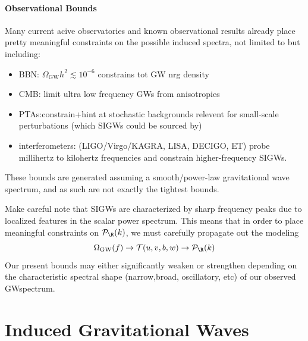 \paragraph{Observational Bounds}
Many current acive observatories and known observational results already place pretty meaningful constraints on the possible induced spectra, not limited to but including:
\begin{itemize}
    \item BBN: $\Omega_{\mathrm{GW}} h^2 \lesssim 10^{-6}$ constrains tot GW nrg density 
    \item CMB: limit ultra low frequency GWs from anisotropies
    \item PTAs:constrain+hint at stochastic backgrounds relevent for small-scale perturbations (which SIGWs could be sourced by)
    \item interferometers: (LIGO/Virgo/KAGRA, LISA, DECIGO, ET) probe millihertz to kilohertz frequencies and constrain higher-frequency SIGWs.
\end{itemize}
These bounds are generated assuming a smooth/power-law gravitational wave spectrum, and as such are not exactly the tightest  bounds.

Make careful note that SIGWs are characterized by sharp frequency peaks due to localized features in the scalar power spectrum. This means that in order to place meaningful constraints on $\mathcal{P}_{\R}(k)$, we must carefully propagate out the modeling
$$
\Omega_{\rm GW}(f)\to\mathcal{T}(u,v,b,w)\to \mathcal{P}_{\R}(k)
$$
Our present bounds may either significantly weaken or strengthen depending on the characteristic spectral shape (narrow,broad, oscillatory, etc) of our observed GWspectrum.



\section{Induced Gravitational Waves}
